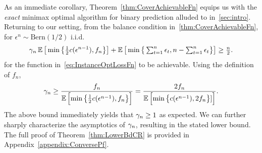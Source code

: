 As an immediate corollary, Theorem~\ref{thm:CoverAchievableFn} equips us with the \emph{exact} minimax optimal algorithm for binary prediction alluded to in~\cref{sec:intro}. 
Returning to our setting, from the balance condition in~\cref{thm:CoverAchievableFn}, for $\epsilon^n \sim \mathrm{Bern}(1/2)$ i.i.d. 
\begin{align*}
\gamma_n \operatorname{\mathbb{E}}\big[\min\big\{\tfrac12 c(\epsilon^{n-1}), f_n\big\}\big] 
+ \operatorname{\mathbb{E}}\big[ \min\big\{\textstyle\sum_{t=1}^n \epsilon_t, n-\textstyle\sum_{t=1}^n \epsilon_t\big\}\big] \ge \frac{n}{2}.
\end{align*}
for the function in~\eqref{eq:InstanceOptLossFn} to be achievable. Using the definition of $f_n$, 
\begin{align*}
    \gamma_n \ge \frac{f_n}{\operatorname{\mathbb{E}}\left[ \min\left\{\tfrac12 c(\epsilon^{n-1}), f_n\right\}\right]} =  \frac{2f_n}{\operatorname{\mathbb{E}}\left[\min\left\{c(\epsilon^{n-1}), 2f_n\right\}]\right]}.
\end{align*}
The above bound immediately yields that $\gamma_n \ge 1$ as expected. We can further sharply characterize the asymptotics of $\gamma_n$, resulting in the stated lower bound. The full proof of Theorem~\ref{thm:LowerBdCR} is provided in Appendix~\ref{appendix:ConversePf}.

%

